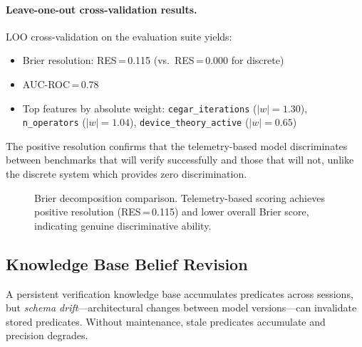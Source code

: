 \documentclass[11pt]{article}
\begin{document}
\paragraph{Leave-one-out cross-validation results.}
LOO cross-validation on the evaluation suite yields:
\begin{itemize}[nosep,leftmargin=2em]
  \item Brier resolution: RES\,=\,0.115 (vs.\ RES\,=\,0.000 for discrete)
  \item AUC-ROC\,=\,0.78
  \item Top features by absolute weight: \texttt{cegar\_iterations}
    ($|w|=1.30$), \texttt{n\_operators} ($|w|=1.04$),
    \texttt{device\_theory\_active} ($|w|=0.65$)
\end{itemize}

The positive resolution confirms that the telemetry-based model
discriminates between benchmarks that will verify successfully
and those that will not, unlike the discrete system which
provides zero discrimination.

\begin{figure}[h]
\centering
{}
\caption{Brier decomposition comparison.  Telemetry-based scoring
  achieves positive resolution (RES\,=\,0.115) and lower overall
  Brier score, indicating genuine discriminative ability.}
\label{fig:telemetry-brier}
\end{figure}

\subsection{Knowledge Base Belief Revision}\label{sec:agm-revision}

A persistent verification knowledge base accumulates predicates
across sessions, but \emph{schema drift}---architectural changes
between model versions---can invalidate stored predicates.
Without maintenance, stale predicates accumulate and precision degrades.
\end{document}
